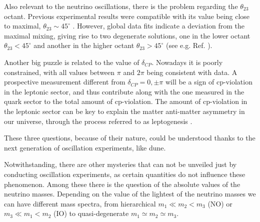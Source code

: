 Also relevant to the neutrino oscillations, there is the problem regarding the $\theta_{23}$ octant. Previous experimental results were compatible with its value being close to maximal, $\theta_{23} \sim 45^{\circ}$ \cite{T2K2015,NOvA2016}. However, global data fits indicate a deviation from the maximal mixing, giving rise to two degenerate solutions, one in the lower octant $\theta_{23} < 45^{\circ}$ and another in the higher octant $\theta_{23} > 45^{\circ}$ (see e.g. Ref. \cite{deSalas2020}).

Another big puzzle is related to the value of $\delta_{CP}$. Nowadays it is poorly constrained, with all values between $\pi$ and $2\pi$ being consistent with data. A prospective measurement different from $\delta_{CP}=0,\pm\pi$ will be a sign of \gls{cp}-violation in the leptonic sector, and thus contribute along with the one measured in the quark sector to the total amount of \gls{cp}-violation. The amount of \gls{cp}-violation in the leptonic sector can be key to explain the matter anti-matter asymmetry in our universe, through the process referred to as leptogenesis \cite{Davidson2008}.

These three questions, because of their nature, could be understood thanks to the next generation of oscillation experiments, like \gls{dune}.

Notwithstanding, there are other mysteries that can not be unveiled just by conducting oscillation experiments, as certain quantities do not influence these phenomenon. Among these there is the question of the absolute values of the neutrino masses. Depending on the value of the lightest of the neutrino masses we can have different mass spectra, from hierarchical $m_{1} \ll m_{2}<m_{3}$ (NO) or $m_{3} \ll m_{1}<m_{2}$ (IO) to quasi-degenerate $m_{1} \simeq m_{2} \simeq m_{3}$.

